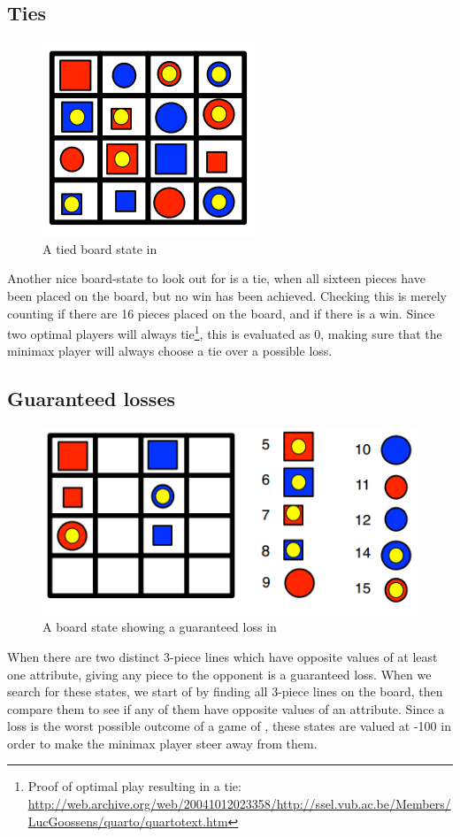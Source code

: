 \subsection{Ties}
\begin{figure}[htb]
\label{fig: tie}
\includegraphics{pictures/tie.png}
\caption[A tie in \quarto{}]{A tied board state in \quarto{}}
\end{figure}
Another nice board-state to look out for is a tie, when all sixteen pieces have 
been placed on the board, but no win has been achieved. Checking this is merely 
counting if there are 16 pieces placed on the board, and if there is a  win. 
Since two optimal players will always tie\footnote{Proof of optimal play 
resulting in a tie: \url{http://web.archive.org/web/20041012023358/http://ssel.vub.ac.be/Members/LucGoossens/quarto/quartotext.htm}}, 
this is evaluated as 0, making sure that the minimax player will always 
choose a tie over a possible loss.

\subsection{Guaranteed losses}
\begin{figure}[htb]
\label{fig: gloss}
\includegraphics{pictures/gloss.png}
\caption[A guaranteed loss in \quarto{}]{A board state showing a guaranteed loss in \quarto{}}
\end{figure}
When there are two distinct 3-piece lines which have opposite values of at least 
one attribute, giving any piece to the opponent is a  guaranteed loss.
When we search for these states, we start of by finding all 3-piece lines on the 
board, then compare them to see if any of them have opposite values of an attribute.
Since a loss is the worst possible outcome of a game of \quarto{}, these states 
are valued at -100 in order to make the minimax player steer away from them.

